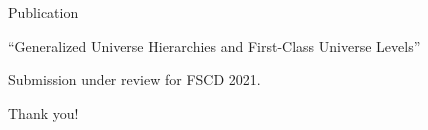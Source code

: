 \documentclass[dvipsnames,10pt,aspectratio=169]{beamer}
\begin{document}

\begin{frame}{Publication}

``Generalized Universe Hierarchies and First-Class Universe Levels''
\vspace{1em}

Submission under review for FSCD 2021.




\end{frame}


\begin{frame}

\begin{center} {\large Thank you!} \end{center}

\end{frame}


\end{document}
